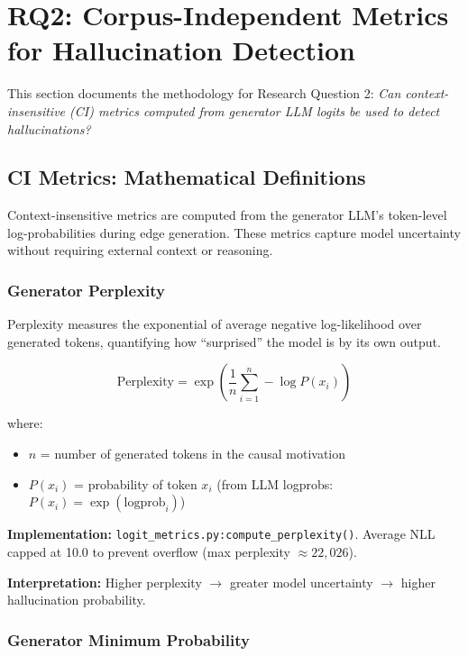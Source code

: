 \section{RQ2: Corpus-Independent Metrics for Hallucination Detection}
\label{sec:rq2_statistical_methods}

This section documents the methodology for Research Question 2: \textit{Can context-insensitive (CI) metrics computed from generator LLM logits be used to detect hallucinations?}

\subsection{CI Metrics: Mathematical Definitions}
\label{sec:ci_metrics_definitions}

Context-insensitive metrics are computed from the generator LLM's token-level log-probabilities during edge generation. These metrics capture model uncertainty without requiring external context or reasoning.

\subsubsection{Generator Perplexity}

Perplexity measures the exponential of average negative log-likelihood over generated tokens, quantifying how ``surprised'' the model is by its own output.

\begin{equation}
\text{Perplexity} = \exp\left(\frac{1}{n}\sum_{i=1}^{n} -\log P(x_i)\right)
\label{eq:perplexity}
\end{equation}

where:
\begin{itemize}
    \item $n$ = number of generated tokens in the causal motivation
    \item $P(x_i)$ = probability of token $x_i$ (from LLM logprobs: $P(x_i) = \exp(\text{logprob}_i)$)
\end{itemize}

\textbf{Implementation:} \texttt{logit\_metrics.py:compute\_perplexity()}. Average NLL capped at 10.0 to prevent overflow (max perplexity $\approx 22{,}026$).

\textbf{Interpretation:} Higher perplexity $\rightarrow$ greater model uncertainty $\rightarrow$ higher hallucination probability.

\subsubsection{Generator Minimum Probability}


